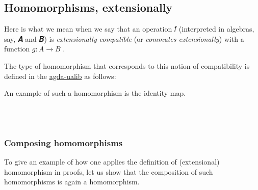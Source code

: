 \documentclass[sigplan,screen]{acmart}
\newcommand{\agdaualib}{\href{https://ualib.org}{agda-ualib}\xspace}
\newcommand{\agdaualib}{\href{anonymizedLink/agda-ualib.html}{agda-ualib}\xspace}
\begin{document}
\subsection{Homomorphisms, extensionally}
Here is what we mean when we say that an operation 𝑓 (interpreted in algebras, say, 𝑨 and 𝑩) is \emph{extensionally compatible} (or \emph{commutes extensionally}) with a function \(g : A → B\) .
\begin{code}\end{code}
The type of homomorphism that corresponds to this notion of compatibility is defined in the \agdaualib as follows:
\begin{code}\end{code}
An example of such a homomorphism is the identity map.
\begin{code}
\\[\AgdaEmptyExtraSkip]%
\>[0]\AgdaSpace{}%
\AgdaSymbol{:}%
\>[6]\AgdaSymbol{(}\AgdaSpace{}%
\AgdaSymbol{:}\AgdaSpace{}%
\AgdaSpace{}%
\AgdaSpace{}%
\AgdaSymbol{)}\AgdaSpace{}%
\AgdaSpace{}%
\AgdaSpace{}%
\AgdaSpace{}%
\<%
\\
\>[0]\AgdaSpace{}%
\AgdaSymbol{\AgdaUnderscore{}}\AgdaSpace{}%
\AgdaSymbol{=}\AgdaSpace{}%
\AgdaSpace{}%
\AgdaSpace{}%
\AgdaSpace{}%
\AgdaSymbol{)}\AgdaSpace{}%
\AgdaOperator{\AgdaInductiveConstructor{,}}\AgdaSpace{}%
\AgdaSpace{}%
\AgdaBound{\AgdaUnderscore{}}\AgdaSpace{}%
\AgdaBound{\AgdaUnderscore{}}\AgdaSpace{}%
\AgdaSpace{}%
\<%
\end{code}
\subsubsection{Composing homomorphisms}
To give an example of how one applies the definition of (extensional) homomorphism in proofs, let us show that the composition of such homomorphisms is again a homomorphism.
\begin{code}\end{code}
\end{document}
